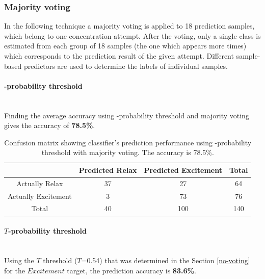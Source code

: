 \documentclass[12pt]{article}
\theoremstyle{definition}
\begin{document}
\subsubsection{Majority voting}

In the following technique a majority voting is applied to 18 prediction samples, which belong to one concentration attempt. After the voting, only a single class is estimated from each group of 18 samples (the one which appears more times) which corresponds to the prediction result of the given attempt. Different sample-based predictors are used to determine the labels of individual samples.

\paragraph{-probability threshold}~\\

Finding the average accuracy using -probability threshold and majority voting gives the accuracy of \textbf{78.5\%}.
\begin{table}[H]
\begin{center}
  \begin{tabular}{ | c | c | c | c | }
    \hline
     & Predicted Relax & Predicted Excitement & Total \\ \hline
    Actually Relax & 37 & 27 & 64 \\ \hline
    Actually Excitement & 3 & 73 & 76 \\ \hline
    Total & 40 & 100 & 140 \\ 
    \hline
  \end{tabular}
\end{center}
\caption{Confusion matrix showing classifier's prediction performance using -probability threshold with majority voting. The accuracy is 78.5\%.} 
\end{table}

\paragraph{$T$-probability threshold}~\\

Using the $T$ threshold ($T$=0.54) that was determined in the Section \ref{no-voting} for the $Excitement$ target, the prediction accuracy is \textbf{83.6\%}.
\end{document}
